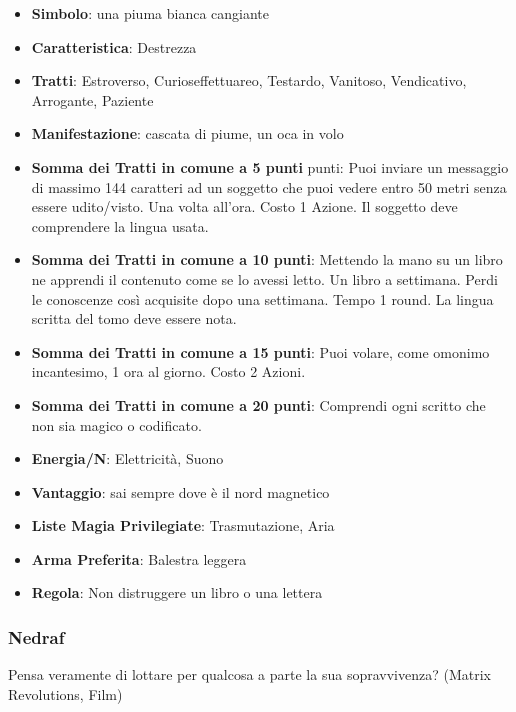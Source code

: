 \begin{multicols}{2}
\begin{itemize}[leftmargin=*] \setlength{\itemsep}{0pt}
\item \textbf{Simbolo}: una piuma bianca cangiante
\item \textbf{Caratteristica}: Destrezza
\item \textbf{Tratti}: Estroverso, Curioseffettuareo, Testardo, Vanitoso, Vendicativo, Arrogante, Paziente
\item \textbf{Manifestazione}: cascata di piume, un oca in volo
\item \textbf{Somma dei Tratti in comune a 5 punti} punti: Puoi inviare un messaggio di massimo 144 caratteri ad un soggetto che puoi vedere entro 50 metri senza essere udito/visto. Una volta all'ora. Costo 1 Azione. Il soggetto deve comprendere la lingua usata.
\item \textbf{Somma dei Tratti in comune a 10 punti}: Mettendo la mano su un libro ne apprendi il contenuto come se lo avessi letto. Un libro a settimana. Perdi le conoscenze così acquisite dopo una settimana. Tempo 1 round. La lingua scritta del tomo deve essere nota.
\item \textbf{Somma dei Tratti in comune a 15 punti}: Puoi volare, come omonimo incantesimo, 1 ora al giorno. Costo 2 Azioni.
\item \textbf{Somma dei Tratti in comune a 20 punti}: Comprendi ogni scritto che non sia magico o codificato.
\item \textbf{Energia/N}: Elettricità, Suono
\item \textbf{Vantaggio}: sai sempre dove è il nord magnetico
\item \textbf{Liste Magia Privilegiate}: Trasmutazione, Aria
\item \textbf{Arma Preferita}: Balestra leggera
\item \textbf{Regola}: Non distruggere un libro o una lettera
\end{itemize}

\subsubsection{Nedraf}\label{nedraf}\hypertarget{nedraf}{}

\begin{changemargin}{0.3cm}{0.3cm}\begin{enfasi}{
Pensa veramente di lottare per qualcosa a parte la sua sopravvivenza? (Matrix Revolutions, Film)

\medskip

}
\end{enfasi}
\end{changemargin}
\end{multicols}
